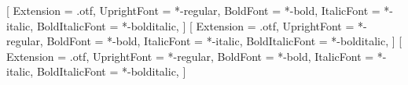 %

\usepackage[main=english]{babel}
\usepackage{fontspec}

\setmainfont{texgyrepagella}[
  Extension      = .otf,
  UprightFont    = *-regular,
  BoldFont       = *-bold,
  ItalicFont     = *-italic,
  BoldItalicFont = *-bolditalic,
]
\setsansfont{texgyreheros}[
  Extension      = .otf,
  UprightFont    = *-regular,
  BoldFont       = *-bold,
  ItalicFont     = *-italic,
  BoldItalicFont = *-bolditalic,
]
\setmonofont{texgyrecursor}[
  Extension      = .otf,
  UprightFont    = *-regular,
  BoldFont       = *-bold,
  ItalicFont     = *-italic,
  BoldItalicFont = *-bolditalic,
]


